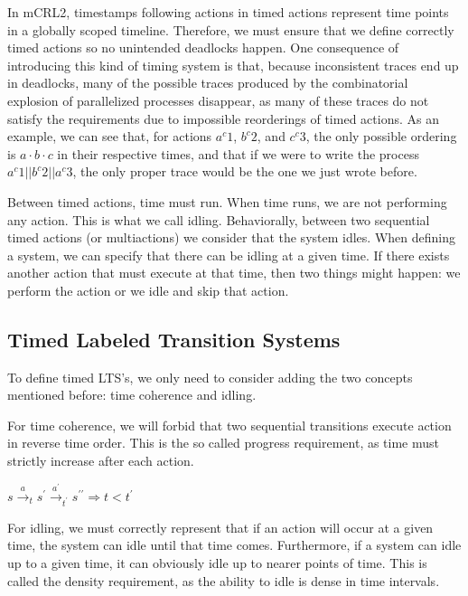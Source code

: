 \documentclass[11pt]{article}
\theoremstyle{definition}
\theoremstyle{plain}
\begin{document}
In mCRL2, timestamps following actions in timed actions represent time points in a globally scoped timeline. Therefore, we must ensure that we define correctly timed actions so no unintended deadlocks happen. One consequence of introducing this kind of timing system is that, because inconsistent traces end up in deadlocks, many of the possible traces produced by the combinatorial explosion of parallelized processes disappear, as many of these traces do not satisfy the requirements due to impossible reorderings of timed actions. As an example, we can see that, for actions $ a^c 1 $, $ b^c 2 $, and $ c^c 3 $, the only possible ordering is $ a\cdot b\cdot c $ in their respective times, and that if we were to write the process $ a^c 1 || b^c 2 || a^c 3 $, the only proper trace would be the one we just wrote before.

Between timed actions, time must run. When time runs, we are not performing any action. This is what we call idling. Behaviorally, between two sequential timed actions (or multiactions) we consider that the system idles. When defining a system, we can specify that there can be idling at a given time. If there exists another action that must execute at that time, then two things might happen: we perform the action or we idle and skip that action.

\subsection{Timed Labeled Transition Systems}

To define timed LTS's, we only need to consider adding the two concepts mentioned before: time coherence and idling.

For time coherence, we will forbid that two sequential transitions execute action in reverse time order. This is the so called progress requirement, as time must strictly increase after each action.

\begin{center}
 $s \xrightarrow{a}_{t} s^\prime \xrightarrow{a^\prime}_{t^\prime} s^{\prime\prime} \Rightarrow t < t^\prime $
\end{center}

For idling, we must correctly represent that if an action will occur at a given time, the system can idle until that time comes. Furthermore, if a system can idle up to a given time, it can obviously idle up to nearer points of time. This is called the density requirement, as the ability to idle is dense in time intervals.
\end{document}
